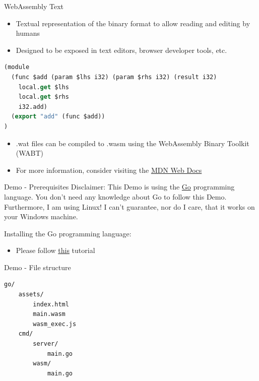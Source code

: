 \documentclass{beamer}
\begin{document}
\begin{frame}[fragile]{WebAssembly Text}
    \begin{itemize}
        \item Textual representation of the binary format to allow reading and editing by humans
        \item Designed to be exposed in text editors, browser developer tools, etc.
    \end{itemize}
    \begin{lstlisting}[language=Lisp,basicstyle=\scriptsize]
(module
  (func $add (param $lhs i32) (param $rhs i32) (result i32)
    local.get $lhs
    local.get $rhs
    i32.add)
  (export "add" (func $add))
)
    \end{lstlisting}
    \begin{itemize}
        \item .wat files can be compiled to .wasm using the WebAssembly Binary Toolkit (WABT)
        \item For more information, consider visiting the \href{https://developer.mozilla.org/en-US/docs/WebAssembly/Understanding_the_text_format}{MDN Web Docs}
    \end{itemize}
\end{frame}

\begin{frame}{Demo - Prerequisites}
    Disclaimer: This Demo is using the \href{https://go.dev/}{Go} programming language. You don't need any knowledge about Go to follow this Demo. Furthermore, I am using Linux! I can't guarantee, nor do I care, that it works on your Windows machine.

    Installing the Go programming language:
    \begin{itemize}
        \item Please follow \underline{\href{https://go.dev/doc/install}{this}} tutorial
    \end{itemize}

\end{frame}

\begin{frame}[fragile]{Demo - File structure}

    \begin{lstlisting}[language=Bash,basicstyle=\scriptsize]
go/
    assets/
        index.html
        main.wasm
        wasm_exec.js
    cmd/
        server/
            main.go
        wasm/
            main.go
    \end{lstlisting}
\end{frame}
\end{document}
